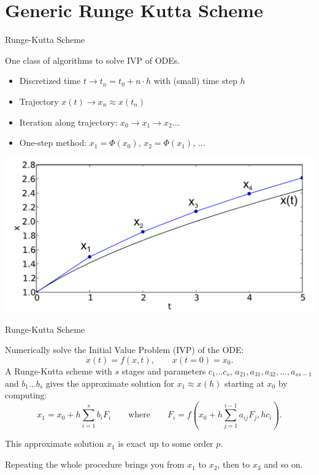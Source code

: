 \documentclass{beamer}
\begin{document}
\section{Generic Runge Kutta Scheme}

\begin{frame}{Runge-Kutta Scheme}

One class of algorithms to solve IVP of ODEs.

\begin{itemize}
 \item Discretized time $t \rightarrow t_n = t_0 + n\cdot h$ with (small) time step $h$
 \item Trajectory $x(t) \rightarrow x_n \approx x(t_n)$
 \item Iteration along trajectory: $x_0 \longrightarrow x_1 \longrightarrow x_2 \dots$
 \item One-step method: $x_1 = \Phi(x_0)$, $x_2 = \Phi(x_1)$, $\dots$ 
\end{itemize}

\pause
\begin{center}
  \includegraphics[width=0.8\linewidth]{x_discrete.pdf}
\end{center}

\end{frame}

\begin{frame}{Runge-Kutta Scheme}

Numerically solve the Initial Value Problem (IVP) of the ODE:
\begin{equation}
 \dot x(t) = f(x,t), \qquad x(t=0) = x_0.
\end{equation}
A Runge-Kutta scheme with $s$ stages and parameters $c_1 \dots c_s$, \hspace{.5em}$a_{21}, a_{31} , a_{32} , \dots , a_{s s-1}$ and $b_1 \dots b_s$
gives the approximate solution for $x_1 \approx x(h)$ starting at $x_0$ by computing:
\begin{equation}
 x_1 = x_0 + h\sum_{i=1}^s b_i F_i \qquad \text{where} \qquad F_i = f( x_0 + h\sum_{j=1}^{i-1} a_{ij} F_j , h c_i ).
\end{equation}

This approximate solution $x_1$ is exact up to some order $p$.

Repeating the whole procedure brings you from $x_1$ to $x_2$, then to $x_3$ and so on.

\end{frame}
\end{document}
